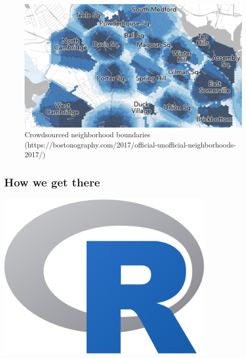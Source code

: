 \documentclass[
  letterpaper,
  DIV=11,
  numbers=noendperiod]{scrartcl}
\begin{document}
\hypertarget{section-4}{%
\subsection{}\label{section-4}}

\begin{figure}

{\centering \includegraphics{InClassStatic/BostonNeighborhoods.JPG}

}

\caption{Crowdsourced neighborhood boundaries
(https://bostonography.com/2017/official-unofficial-neighborhoods-2017/)}

\end{figure}

\hypertarget{how-we-get-there}{%
\subsection{How we get there}\label{how-we-get-there}}

\includegraphics[width=4.07292in,height=\textheight]{InClassStatic/rLogo.png}
\end{document}
